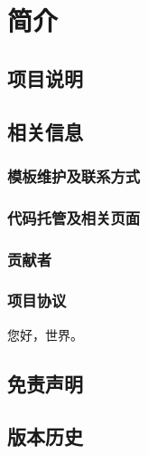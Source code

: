 \chapter{简介}

\section{项目说明}

\section{相关信息}


\subsection{模板维护及联系方式}

\subsection{代码托管及相关页面}

\subsection{贡献者}

\subsection{项目协议}

您好，世界。
\section{免责声明}

\section{版本历史}

